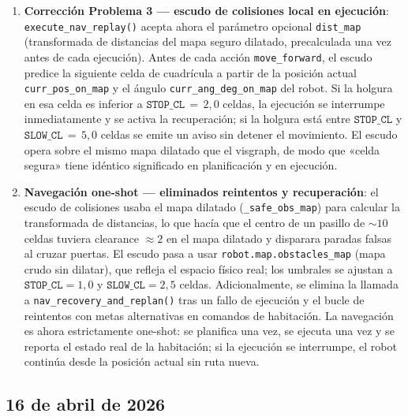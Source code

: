 \begin{enumerate}
  \item \textbf{Corrección Problema 3 — escudo de colisiones local en ejecución}:
        \texttt{execute\_nav\_replay()} acepta ahora el parámetro opcional
        \texttt{dist\_map} (transformada de distancias del mapa seguro dilatado,
        precalculada una vez antes de cada ejecución). Antes de cada acción
        \texttt{move\_forward}, el escudo predice la siguiente celda de cuadrícula a
        partir de la posición actual \texttt{curr\_pos\_on\_map} y el ángulo
        \texttt{curr\_ang\_deg\_on\_map} del robot. Si la holgura en esa celda es
        inferior a $\texttt{STOP\_CL}\,{=}\,2{,}0$ celdas, la ejecución se interrumpe
        inmediatamente y se activa la recuperación; si la holgura está entre
        $\texttt{STOP\_CL}$ y $\texttt{SLOW\_CL}\,{=}\,5{,}0$ celdas se emite un aviso
        sin detener el movimiento. El escudo opera sobre el mismo mapa dilatado que el
        visgraph, de modo que «celda segura» tiene idéntico significado en planificación
        y en ejecución.

  \item \textbf{Navegación one-shot — eliminados reintentos y recuperación}:
        el escudo de colisiones usaba el mapa dilatado (\texttt{\_safe\_obs\_map})
        para calcular la transformada de distancias, lo que hacía que el centro de
        un pasillo de $\sim10$ celdas tuviera clearance $\approx 2$ en el mapa
        dilatado y disparara paradas falsas al cruzar puertas. El escudo pasa a usar
        \texttt{robot.map.obstacles\_map} (mapa crudo sin dilatar), que refleja el
        espacio físico real; los umbrales se ajustan a
        $\texttt{STOP\_CL}=1{,}0$ y $\texttt{SLOW\_CL}=2{,}5$ celdas.
        Adicionalmente, se elimina la llamada a \texttt{nav\_recovery\_and\_replan()}
        tras un fallo de ejecución y el bucle de reintentos con metas alternativas
        en comandos de habitación. La navegación es ahora estrictamente one-shot:
        se planifica una vez, se ejecuta una vez y se reporta el estado real de la
        habitación; si la ejecución se interrumpe, el robot continúa desde la posición
        actual sin ruta nueva.
\end{enumerate}

\subsection*{16 de abril de 2026}

